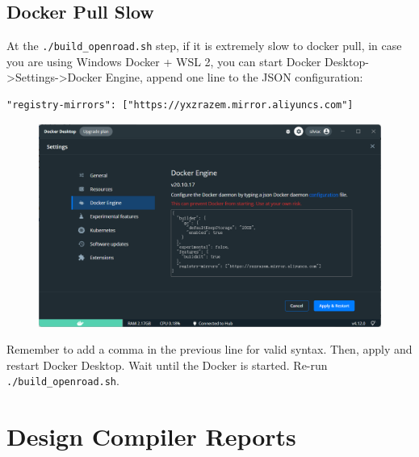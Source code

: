 \documentclass[a4paper,12pt,twoside]{article}
\begin{document}
\subsection{Docker Pull Slow}
At the \texttt{./build\_openroad.sh} step, if it is extremely slow to docker pull, in case you are using Windows Docker + WSL 2, you can start Docker Desktop->Settings->Docker Engine, append one line to the JSON configuration:
\begin{verbatim}
"registry-mirrors": ["https://yxzrazem.mirror.aliyuncs.com"]
\end{verbatim}
\begin{figure}[H]
    \centering
    \includegraphics[width=\textwidth]{images/23.png}
\end{figure}
Remember to add a comma in the previous line for valid syntax. Then, apply and restart Docker Desktop. Wait until the Docker is started. Re-run \texttt{./build\_openroad.sh}.

\section{Design Compiler Reports}\label{ADC}
\end{document}
